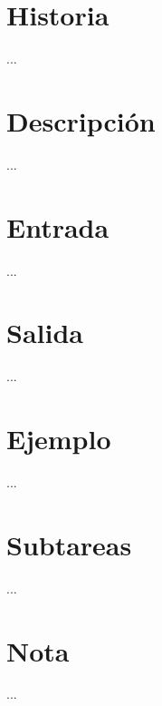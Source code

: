 
\section*{Historia}

...

\section*{Descripción}

...

\section*{Entrada}

...

\section*{Salida}

...

\section*{Ejemplo}

...

\section*{Subtareas}

...

\section*{Nota}

...